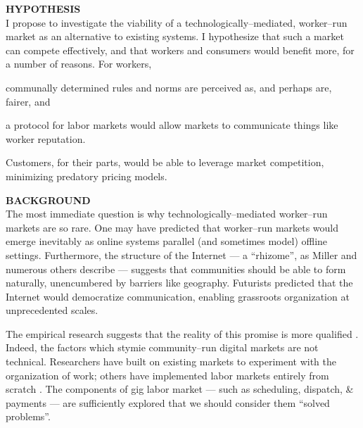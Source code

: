 \documentclass[12pt]{article}
\newcommand{\sectitle}[1]{\textbf{\MakeUppercase{#1}}}
\begin{document}
\sectitle{hypothesis}\\
I propose to investigate the viability of a technologically--mediated,
worker--run market as an alternative to existing systems.
I hypothesize that
such a market can compete effectively,
and that workers and consumers would benefit more, %
for a number of reasons.
For workers,
\begin{inlinelist} %
  \item communally determined rules and norms are perceived as, and perhaps are, fairer, and
  \item a protocol for labor markets would allow markets to communicate things like worker reputation.
\end{inlinelist}
Customers, for their parts, would be able
  to leverage market competition, minimizing predatory pricing models.


\sectitle{background}\\
The most immediate question is why technologically--mediated
worker--run markets are so rare.
One may have predicted that worker--run markets would emerge inevitably
as online systems parallel (and sometimes model) offline settings.
Furthermore, the structure of the Internet
--- a ``rhizome'', as Miller and numerous others describe \cite{miller2011understanding} ---
suggests that communities should be able to form naturally,
unencumbered by barriers like geography.
Futurists predicted that the Internet would democratize communication,
enabling grassroots organization at unprecedented scales.

The empirical research suggests that the reality of this promise is more qualified
\cite{dynamo,toyama2015geek}.
Indeed, the factors which stymie community--run digital markets are not technical.
Researchers have built on existing markets to experiment with the organization of work;
others have implemented labor markets entirely from scratch
\cite{Alek2011,foundry}.
The components of gig labor market
--- such as scheduling, dispatch, \& payments ---
are sufficiently explored that we should consider them ``solved problems''.
\end{document}
